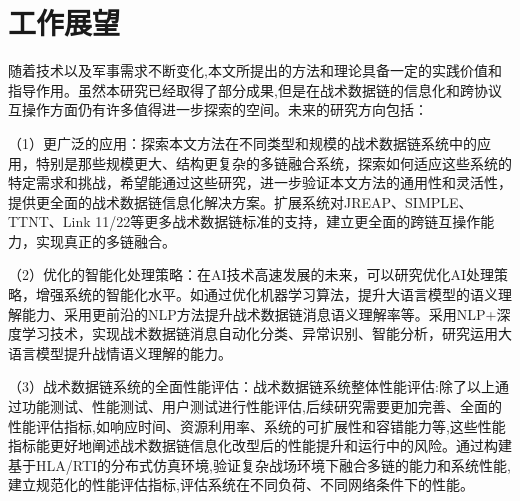 \section{工作展望}

随着技术以及军事需求不断变化,本文所提出的方法和理论具备一定的实践价值和指导作用。虽然本研究已经取得了部分成果,但是在战术数据链的信息化和跨协议互操作方面仍有许多值得进一步探索的空间。未来的研究方向包括：

（1）更广泛的应用：探索本文方法在不同类型和规模的战术数据链系统中的应用，特别是那些规模更大、结构更复杂的多链融合系统，探索如何适应这些系统的特定需求和挑战，希望能通过这些研究，进一步验证本文方法的通用性和灵活性，提供更全面的战术数据链信息化解决方案。扩展系统对JREAP、SIMPLE、TTNT、Link 11/22等更多战术数据链标准的支持，建立更全面的跨链互操作能力，实现真正的多链融合。

（2）优化的智能化处理策略：在AI技术高速发展的未来，可以研究优化AI处理策略，增强系统的智能化水平。如通过优化机器学习算法，提升大语言模型的语义理解能力、采用更前沿的NLP方法提升战术数据链消息语义理解率等。采用NLP+深度学习技术，实现战术数据链消息自动化分类、异常识别、智能分析，研究运用大语言模型提升战情语义理解的能力。

（3）战术数据链系统的全面性能评估：战术数据链系统整体性能评估:除了以上通过功能测试、性能测试、用户测试进行性能评估,后续研究需要更加完善、全面的性能评估指标,如响应时间、资源利用率、系统的可扩展性和容错能力等,这些性能指标能更好地阐述战术数据链信息化改型后的性能提升和运行中的风险。通过构建基于HLA/RTI的分布式仿真环境,验证复杂战场环境下融合多链的能力和系统性能,建立规范化的性能评估指标,评估系统在不同负荷、不同网络条件下的性能。


